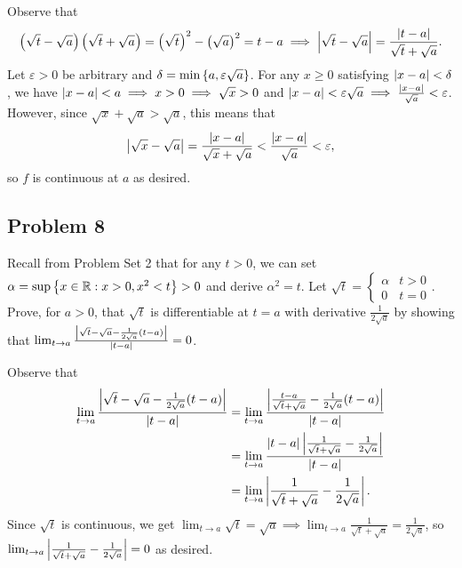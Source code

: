 \documentclass[main.tex]{subfiles}
\begin{document}
\begin{soln}
    Observe that
    \[\left( \sqrt{t} - \sqrt{a} \right)\left( \sqrt{t} + \sqrt{a} \right) = \left( \sqrt{t} \right)^2 - \left( \sqrt{a} \right)^2 = t - a \implies \left\lvert \sqrt{t} - \sqrt{a} \right\rvert = \frac{\left\lvert t - a \right\rvert}{\sqrt{t} + \sqrt{a}}.\]
    Let $\varepsilon > 0$ be arbitrary and $\delta = \min\left\{ a, \varepsilon\sqrt{a} \right\}$. For any $x \ge 0$ satisfying $\left\lvert x - a \right\rvert < \delta$, we have $\left\lvert x - a \right\rvert < a\implies x > 0\implies \sqrt{x} > 0$ and $\left\lvert x - a \right\rvert < \varepsilon\sqrt{a}\implies \frac{\left\lvert x - a \right\rvert}{\sqrt{a}} < \varepsilon$. However, since $\sqrt{x} + \sqrt{a} > \sqrt{a}$, this means that
    \[\left\lvert \sqrt{x} - \sqrt{a} \right\rvert = \frac{\left\lvert x - a \right\rvert}{\sqrt{x} + \sqrt{a}} < \frac{\left\lvert x - a \right\rvert}{\sqrt{a}} < \varepsilon,\]
    so $f$ is continuous at $a$ as desired.
\end{soln}
\eject

\subsection{Problem 8}
\begin{claim}
    Recall from Problem Set 2 that for any $t > 0$, we can set $\alpha = \sup\left\{ x \in \mathbb R : x > 0, x^2 < t \right\}> 0$ and derive $\alpha^2 = t$. Let $\sqrt{t} = \begin{cases} \alpha & t > 0 \\
    0 & t = 0\end{cases}$. Prove, for $a > 0$, that $\sqrt{t}$ is differentiable at $t = a$ with derivative $\frac{1}{2\sqrt{a}}$ by showing that $\lim_{t\to a}\frac{\left\lvert \sqrt{t} - \sqrt{a} - \frac{1}{2\sqrt{a}}(t-a) \right\rvert}{\left\lvert t-a \right\rvert} = 0$.
\end{claim}

\begin{soln}
    Observe that
    \begin{align*}
        \lim_{t\to a}\frac{\left\lvert \sqrt{t} - \sqrt{a} - \frac{1}{2\sqrt{a}}(t-a) \right\rvert}{\left\lvert t-a \right\rvert} &= \lim_{t\to a}\frac{\left\lvert \frac{t - a}{\sqrt{t} + \sqrt{a}} - \frac{1}{2\sqrt{a}}(t-a) \right\rvert}{\left\lvert t-a \right\rvert} \\
        &= \lim_{t\to a}\frac{\left\lvert t - a \right\rvert\left\lvert \frac{1}{\sqrt{t} + \sqrt{a}} - \frac{1}{2\sqrt{a}} \right\rvert}{\left\lvert t-a \right\rvert} \\
        &= \lim_{t\to a} \left\lvert \frac{1}{\sqrt{t} + \sqrt{a}} - \frac{1}{2\sqrt{a}} \right\rvert.
    \end{align*}
    Since $\sqrt{t}$ is continuous, we get $\lim_{t\to a} \sqrt{t} = \sqrt{a}\implies \lim_{t\to a} \frac{1}{\sqrt{t} + \sqrt{a}} = \frac{1}{2\sqrt{a}}$, so $\lim_{t\to a} \left\lvert \frac{1}{\sqrt{t} + \sqrt{a}} - \frac{1}{2\sqrt{a}} \right\rvert = 0$ as desired.
\end{soln}
\eject
\end{document}

